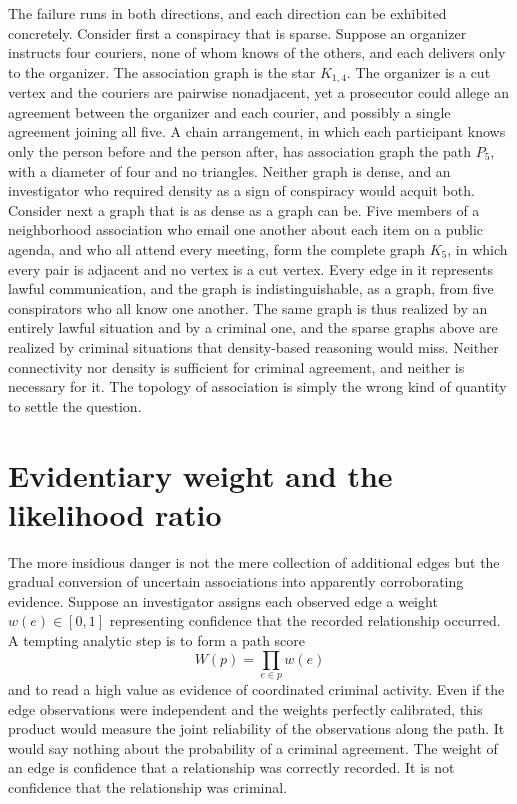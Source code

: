 \documentclass[11pt]{article}
\theoremstyle{definition}
\theoremstyle{remark}
\begin{document}
The failure runs in both directions, and each direction can be exhibited concretely. Consider first a conspiracy that is sparse. Suppose an organizer instructs four couriers, none of whom knows of the others, and each delivers only to the organizer. The association graph is the star $K_{1,4}$. The organizer is a cut vertex and the couriers are pairwise nonadjacent, yet a prosecutor could allege an agreement between the organizer and each courier, and possibly a single agreement joining all five. A chain arrangement, in which each participant knows only the person before and the person after, has association graph the path $P_5$, with a diameter of four and no triangles. Neither graph is dense, and an investigator who required density as a sign of conspiracy would acquit both. Consider next a graph that is as dense as a graph can be. Five members of a neighborhood association who email one another about each item on a public agenda, and who all attend every meeting, form the complete graph $K_5$, in which every pair is adjacent and no vertex is a cut vertex. Every edge in it represents lawful communication, and the graph is indistinguishable, as a graph, from five conspirators who all know one another. The same graph is thus realized by an entirely lawful situation and by a criminal one, and the sparse graphs above are realized by criminal situations that density-based reasoning would miss. Neither connectivity nor density is sufficient for criminal agreement, and neither is necessary for it. The topology of association is simply the wrong kind of quantity to settle the question.

\section{Evidentiary weight and the likelihood ratio}

The more insidious danger is not the mere collection of additional edges but the gradual conversion of uncertain associations into apparently corroborating evidence. Suppose an investigator assigns each observed edge a weight $w(e) \in [0,1]$ representing confidence that the recorded relationship occurred. A tempting analytic step is to form a path score
\[
W(p) = \prod_{e \in p} w(e)
\]
and to read a high value as evidence of coordinated criminal activity. Even if the edge observations were independent and the weights perfectly calibrated, this product would measure the joint reliability of the observations along the path. It would say nothing about the probability of a criminal agreement. The weight of an edge is confidence that a relationship was correctly recorded. It is not confidence that the relationship was criminal.
\end{document}
